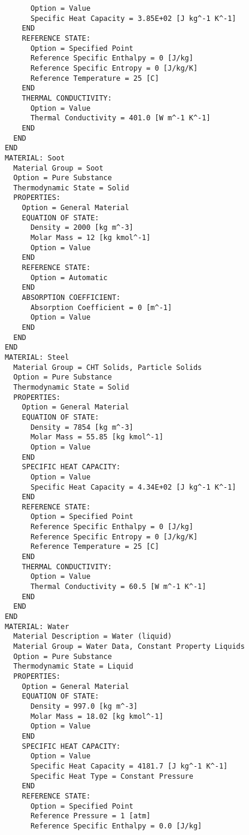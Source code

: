 \begin{verbatim}
            Option = Value
            Specific Heat Capacity = 3.85E+02 [J kg^-1 K^-1]
          END
          REFERENCE STATE:
            Option = Specified Point
            Reference Specific Enthalpy = 0 [J/kg]
            Reference Specific Entropy = 0 [J/kg/K]
            Reference Temperature = 25 [C]
          END
          THERMAL CONDUCTIVITY:
            Option = Value
            Thermal Conductivity = 401.0 [W m^-1 K^-1]
          END
        END
      END
      MATERIAL: Soot
        Material Group = Soot
        Option = Pure Substance
        Thermodynamic State = Solid
        PROPERTIES:
          Option = General Material
          EQUATION OF STATE:
            Density = 2000 [kg m^-3]
            Molar Mass = 12 [kg kmol^-1]
            Option = Value
          END
          REFERENCE STATE:
            Option = Automatic
          END
          ABSORPTION COEFFICIENT:
            Absorption Coefficient = 0 [m^-1]
            Option = Value
          END
        END
      END
      MATERIAL: Steel
        Material Group = CHT Solids, Particle Solids
        Option = Pure Substance
        Thermodynamic State = Solid
        PROPERTIES:
          Option = General Material
          EQUATION OF STATE:
            Density = 7854 [kg m^-3]
            Molar Mass = 55.85 [kg kmol^-1]
            Option = Value
          END
          SPECIFIC HEAT CAPACITY:
            Option = Value
            Specific Heat Capacity = 4.34E+02 [J kg^-1 K^-1]
          END
          REFERENCE STATE:
            Option = Specified Point
            Reference Specific Enthalpy = 0 [J/kg]
            Reference Specific Entropy = 0 [J/kg/K]
            Reference Temperature = 25 [C]
          END
          THERMAL CONDUCTIVITY:
            Option = Value
            Thermal Conductivity = 60.5 [W m^-1 K^-1]
          END
        END
      END
      MATERIAL: Water
        Material Description = Water (liquid)
        Material Group = Water Data, Constant Property Liquids
        Option = Pure Substance
        Thermodynamic State = Liquid
        PROPERTIES:
          Option = General Material
          EQUATION OF STATE:
            Density = 997.0 [kg m^-3]
            Molar Mass = 18.02 [kg kmol^-1]
            Option = Value
          END
          SPECIFIC HEAT CAPACITY:
            Option = Value
            Specific Heat Capacity = 4181.7 [J kg^-1 K^-1]
            Specific Heat Type = Constant Pressure
          END
          REFERENCE STATE:
            Option = Specified Point
            Reference Pressure = 1 [atm]
            Reference Specific Enthalpy = 0.0 [J/kg]

\end{verbatim}
